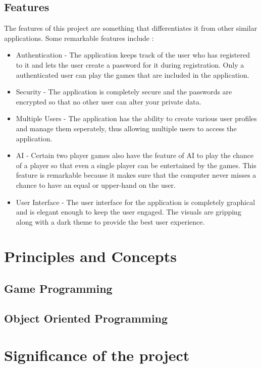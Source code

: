 \documentclass[12pt]{article}
\begin{document}
		\subsection{Features}
		\begin{flushleft}
			\setlength{\parindent}{10ex}
			The features of this project are something that differentiates it from other similar applications. Some remarkable features include :
			\begin{itemize}
				\item Authentication - The application keeps track of the user who has registered to it and lets the user create a password for it during registration. Only a authenticated user can play the games that are included in the application.
				\item Security - The application is completely secure and the passwords are encrypted so that no other user can alter your private data.
				\item Multiple Users - The application has the ability to create various user profiles and manage them seperately, thus allowing multiple users to access the application.
				\item AI - Certain two player games also have the feature of AI to play the chance of a player so that even a single player can be entertained by the games. This feature is remarkable because it makes sure that the computer never misses a chance to have an equal or upper-hand on the user.
				\item User Interface - The user interface for the application is completely graphical and is elegant enough to keep the user engaged. The visuals are gripping along with a dark theme to provide the best user experience.
			\end{itemize}
		\end{flushleft}
		
		\clearpage
		
		\section{Principles and Concepts}
		\subsection{Game Programming}
		\subsection{Object Oriented Programming}
		
		\clearpage
		
		\section{Significance of the project}
		
		\clearpage
		
		\clearpage
		
		
		
		
	
\end{document}
